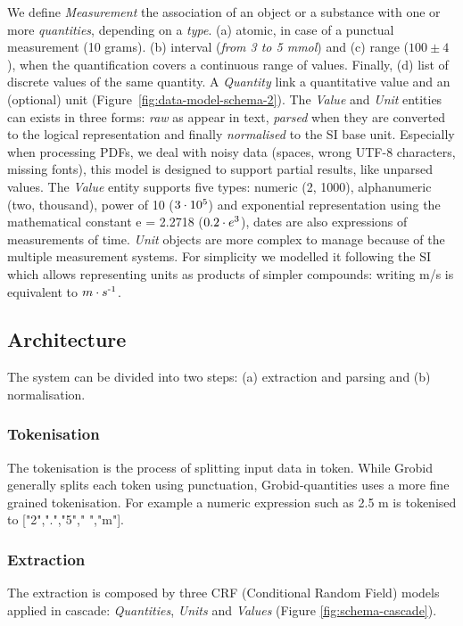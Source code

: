\documentclass[sigconf]{acmart}
\begin{document}
We define \textit{Measurement} the association of an object or a substance with one or more \textit{quantities}, depending on a \textit{type}. (a) atomic, in case of a punctual measurement (10 grams). (b) interval (\textit{from 3 to 5 mmol}) and (c) range ($100 \pm 4$), when the quantification covers a continuous range of values. Finally, (d) list of discrete values of the same quantity. A \textit{Quantity} link a  quantitative value and an (optional) unit (Figure~\ref{fig:data-model-schema-2}). The \textit{Value} and \textit{Unit} entities can exists in three forms: \textit{raw} as appear in text, \textit{parsed} when they are converted to the logical representation and finally \textit{normalised} to the SI base unit. Especially when processing PDFs, we deal with noisy data (spaces, wrong UTF-8 characters, missing fonts), this model is designed to support partial results, like unparsed values. The \textit{Value} entity supports five types: numeric (2, 1000), alphanumeric (two, thousand), power of 10 ($3\cdot10\textsuperscript{5}$) and exponential representation using the mathematical constant e = 2.2718 ($0.2\cdot e\textsuperscript{3}$), dates are also expressions of measurements of time. \textit{Unit} objects are more complex to manage because of the multiple measurement systems. For simplicity we modelled it following the SI which allows representing units as products of simpler compounds: writing m/s is equivalent to $m \cdot s\textsuperscript{-1}$.

\subsection{Architecture}
The system can be divided into two steps: (a) extraction and parsing and (b) normalisation. 

\subsubsection{Tokenisation}
The tokenisation is the process of splitting input data in token. While Grobid generally splits each token using punctuation, Grobid-quantities uses a more fine grained tokenisation. For example a numeric expression such as 2.5 m is tokenised to ["2",".","5"," ","m"]. 

\subsubsection{Extraction}
The extraction is composed by three CRF (Conditional Random Field) models applied in cascade: \textit{Quantities}, \textit{Units} and \textit{Values} (Figure \ref{fig:schema-cascade}). 
\end{document}
